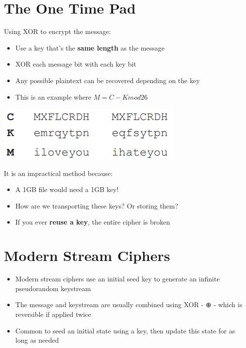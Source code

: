 \documentclass{article}
\begin{document}
\section{The One Time Pad}
\begin{flushleft}
Using XOR to encrypt the message:
\begin{itemize}
  \item Use a key that’s the \textbf{same length} as the message 
  \item XOR each message bit with each key bit
  \item Any possible plaintext can be recovered depending on the key
  \item This is an example where $M = C - K mod 26$
\end{itemize}
\end{flushleft}
\begin{center}
  \includegraphics[scale=0.5]{one_time-pad.png}
\end{center}
\begin{flushleft}
It is an impractical method because:
\end{flushleft}
\begin{itemize}
  \item A 1GB file would need a 1GB key! 
  \item How are we transporting these keys? Or storing them? 
  \item If you ever \textbf{reuse a key}, the entire cipher is broken
\end{itemize}

\section{Modern Stream Ciphers}
\begin{itemize}
  \item Modern stream ciphers use an initial seed key to generate an infinite pseudorandom keystream 
  \item The message and keystream are usually combined using XOR - ⊕ - which is reversible if applied twice
  \item Common to seed an initial state using a key, then update this state for as long as needed
\end{itemize}
\end{document}
